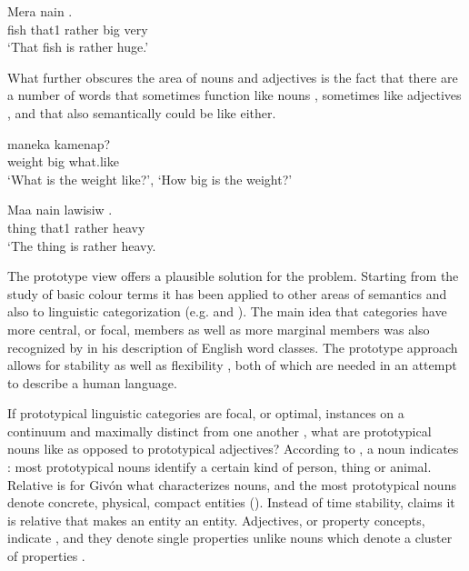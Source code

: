 \ea%
\label{ex:3:x18}
\gll Mera nain   . \\
fish that1 rather big very\\
\glt`That fish is rather huge.'
\z

What further obscures the area of nouns and adjectives is the fact that there are a number of words that sometimes function like nouns , sometimes like adjectives , and that also semantically could be like either.

\ea%
\label{ex:3:x20}
\gll {} maneka kamenap? \\
weight big what.like\\
\glt`What is the weight like?', `How big is the weight?'
\z

\ea%
\label{ex:3:x21}
\gll Maa nain lawisiw . \\
thing that1 rather heavy\\
\glt`The thing is rather heavy.
\z

The prototype view offers a plausible solution for the problem. Starting from the study of basic colour terms \citep{BerlinEtAl1969} it has been applied to other areas of semantics and also to linguistic categorization (e.g. \citealt{Wierzbicka1986, Taylor1989} and \citealt{Frawley1992}). The main idea that categories have more central, or focal, members as well as more marginal members was also recognized by \citet{Crystal1967} in his description of English word classes. The prototype approach allows for stability as well as flexibility \citep[53]{Taylor1989}, both of which are needed in an attempt to describe a human language.

If prototypical linguistic categories are focal, or optimal, instances on a continuum \citep[321]{Seiler1978} and maximally distinct from one another \citep[709]{HopperEtAl1984}%
, what are prototypical nouns like as opposed to prototypical adjectives? According to \citet{Wierzbicka1986}, a noun indicates : most prototypical nouns identify a certain kind of person, thing or animal. Relative  is for Giv\'on what characterizes nouns, and the most prototypical nouns denote concrete, physical, compact entities (\citeyear[151]{Givon1984}). Instead of time stability, \citet[66]{Frawley1992} claims it is relative \textstyleEmphasizedWords{} that makes an entity an entity. Adjectives, or property concepts, indicate , and they denote single properties unlike nouns which denote a cluster of properties \citep{Wierzbicka1986}.

